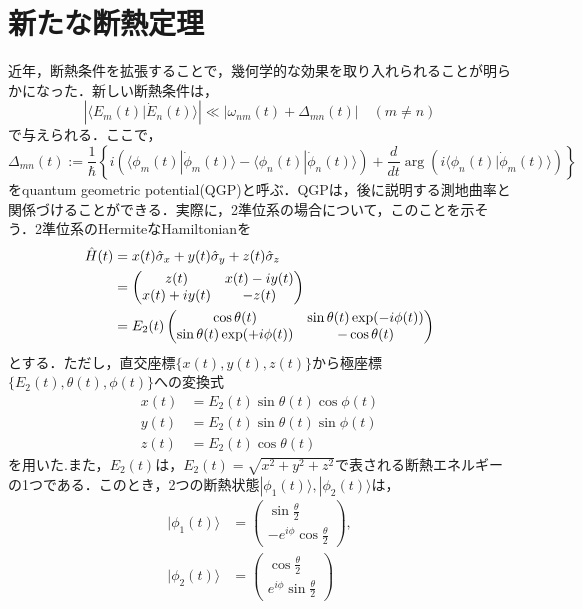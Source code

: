 \documentclass[a4paper, titlepage]{jsreport}
\begin{document}
\section{新たな断熱定理}
近年，断熱条件を拡張することで，幾何学的な効果を取り入れられることが明らかになった\cite{Wu2008}．新しい断熱条件は，
\begin{equation}
  \left| \langle E_m(t) | \Dot{E}_n(t) \rangle \right| \ll \left| \omega_{nm}(t) + \Delta_{mn}(t) \right| \quad (m\ne n) 
\end{equation}
で与えられる．ここで，
\begin{equation}
  \Delta_{mn}(t) := \frac{1}{\hbar} \left\{ i \left( \langle \phi_m(t) | \Dot{\phi}_m(t) \rangle - \langle \phi_n(t) | \Dot{\phi}_n(t) \rangle \right)+ \frac{d}{dt} \arg \left( i \langle \phi_n(t) | \Dot{\phi}_m(t) \rangle \right) \right\}
\end{equation}
をquantum geometric potential(QGP)と呼ぶ．QGPは，後に説明する測地曲率と関係づけることができる．実際に，2準位系の場合について，このことを示そう．2準位系のHermiteなHamiltonianを
    \begin{align}
    \Hat{H}(t)&=x(t)\Hat{\sigma}_x + y(t) \Hat{\sigma}_y + z(t) \Hat{\sigma}_z\\
    &=
    \begin{pmatrix} 
    z(t) & x(t) - iy(t)\\
    x(t) + iy(t) & -z(t)\\
    \end{pmatrix}\\
    &= E_2(t)
    \begin{pmatrix} 
    \cos \theta(t)&\sin \theta(t) \exp(-i\phi(t))\\
    \sin \theta(t) \exp(+i\phi(t))&-\cos \theta(t)\\
    \end{pmatrix}
\end{align}
とする．ただし，直交座標$\{x(t), y(t), z(t)\}$から極座標$\{E_2(t), \theta(t), \phi(t)\}$への変換式
\begin{align}
  x(t) &= E_2(t) \sin \theta(t) \cos \phi(t)\\
  y(t) &= E_2(t) \sin \theta(t) \sin \phi(t)\\
  z(t) &= E_2(t) \cos \theta(t)
\end{align}
を用いた.また，$E_2(t)$は，$E_2(t) = \sqrt{x^2 + y^2 + z^2}$で表される断熱エネルギーの1つである．このとき，2つの断熱状態$|\phi_1(t) \rangle, |\phi_2(t) \rangle$は，
\begin{align}
  |\phi_1(t) \rangle &= 
  \begin{pmatrix}
    \sin \frac{\theta}{2}\\
    -e^{i\phi} \cos \frac{\theta}{2}
  \end{pmatrix},\\
  |\phi_2(t) \rangle &=
  \begin{pmatrix}
    \cos \frac{\theta}{2}\\
    e^{i\phi} \sin \frac{\theta}{2}
  \end{pmatrix}
\end{align}
\end{document}
